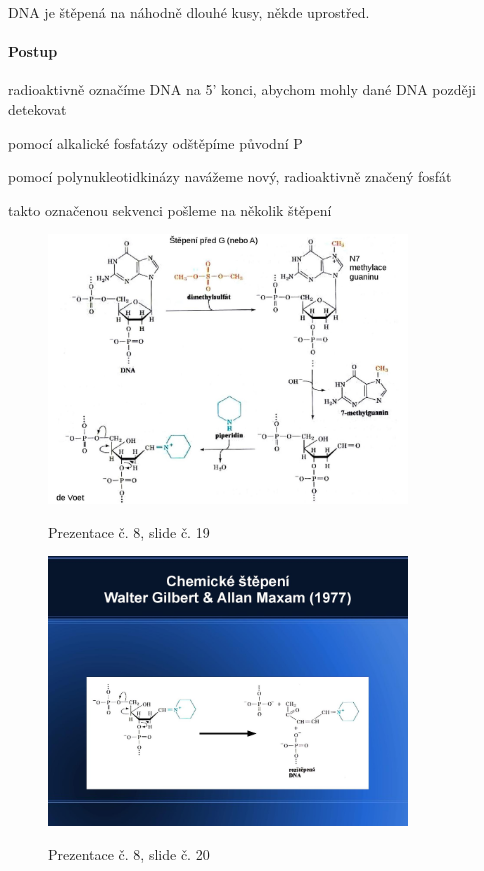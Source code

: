 \documentclass[DIV=8]{scrreprt}
\begin{document}
DNA je štěpená na náhodně dlouhé kusy, někde uprostřed.

\paragraph{Postup}
\begin{myEnumerate}[nosep]
    \item radioaktivně označíme DNA na 5' konci, abychom mohly dané DNA později detekovat
\begin{myItemize}[nosep]
    \item pomocí alkalické fosfatázy odštěpíme původní P
    \item pomocí polynukleotidkinázy navážeme nový, radioaktivně značený fosfát
\end{myItemize}

    \item takto označenou sekvenci pošleme na několik štěpení
\end{myEnumerate}



\begin{figure}
    \caption{Prezentace č. 8, slide č. 19}
    \includegraphics[width=0.85\textwidth]{slides-8/slide-19.jpg}
    \centering
    \label{slides-8-slide-19}
\end{figure}
\begin{figure}
    \caption{Prezentace č. 8, slide č. 20}
    \includegraphics[width=0.85\textwidth]{slides-8/slide-20.jpg}
    \centering
    \label{slides-8-slide-20}
\end{figure}
\end{document}
